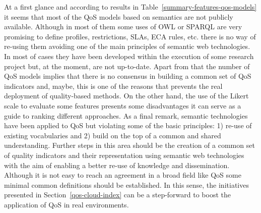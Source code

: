 At a first glance and according to results in Table~\ref{summary-features-qos-models} it seems that most of the QoS models 
based on semantics are not publicly available. Although in most of them some uses of OWL or SPARQL are very promising 
to define profiles, restrictions, SLAs, ECA rules, etc. there is no way of re-using them avoiding one of the main 
principles of semantic web technologies. In most of cases they have been developed within the execution of some 
research project but, at the moment, are not up-to-date. Apart from that the number of QoS models implies that 
there is no consensus in building a common set of QoS indicators and, maybe, this is one of the reasons that 
prevents the real deployment of quality-based methods. On the other hand, the use of the Likert scale to evaluate 
some features presents some disadvantages it can serve as a guide to ranking different approaches. As a final remark, semantic 
technologies have been applied to QoS but violating some of the basic principles: 1) re-use of existing vocabularies and 2) 
build on the top of a common and shared understanding. Further steps in this area should be the creation of a common set 
of quality indicators and their representation using semantic web technologies with the aim of enabling a better 
re-use of knowledge and dissemination. Although it is not easy to reach an agreement in a broad field like QoS some 
minimal common definitions should be established. In this sense, the initiatives presented in Section~\ref{qos-cloud-index} 
can be a step-forward to boost the application of QoS in real environments.

\clearpage
